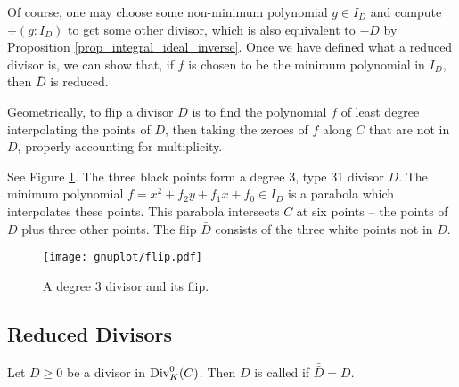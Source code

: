 Of course, one may choose some non-minimum polynomial $g \in I_D$ and compute $\div(g : I_D)$ to get some other
divisor, which is also equivalent to $-D$ by Proposition \ref{prop_integral_ideal_inverse}.
Once we have defined what a reduced divisor is, we can show that,
if $f$ is chosen to be the minimum polynomial in $I_D$, then $\bar D$ is reduced.

Geometrically, to flip a divisor $D$ is to find the polynomial $f$ of least degree interpolating the points of $D$,
then taking the zeroes of $f$ along $C$ that are not in $D$, properly accounting for multiplicity.
\begin{example}
  See Figure \ref{fig_divisor_flip}.
  The three black points form a degree 3, type 31 divisor $D$. 
  The minimum polynomial $f = x^2 + f_2y + f_1x + f_0 \in I_D$
  is a parabola which interpolates these points.
  This parabola intersects $C$ at six points -- the points of $D$ plus three other points.
  The flip $\bar D$ consists of the three white points not in $D$.
\end{example}

\begin{figure}[ht!]
  \caption{A degree 3 divisor and its flip.}
  \label{fig_divisor_flip}
  \begin{center}
    \texttt{[image: gnuplot/flip.pdf]}
  \end{center}
\end{figure}


\subsection{Reduced Divisors}

\begin{definition}
  \label{def_reduced_divisor}
  Let $D \geq 0$ be a divisor in $\operatorname{Div}_K^0(C)$.
  Then $D$ is called  if $\bar{\bar D} = D$.
\end{definition}

